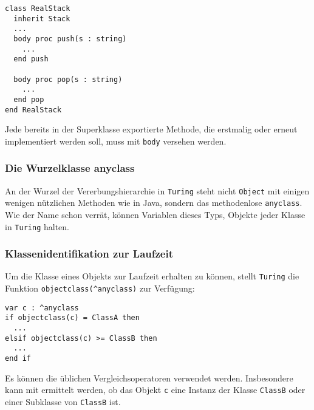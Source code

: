 \lstset{label=LIS:stack:real}
\begin{table}[h!]
\begin{lstlisting}
class RealStack
  inherit Stack
  ... 
  body proc push(s : string) 
    ...
  end push
  
  body proc pop(s : string)
    ...
  end pop
end RealStack
\end{lstlisting}
\end{table}
Jede bereits in der Superklasse exportierte Methode, die erstmalig oder erneut implementiert werden soll, muss mit \lstinline{body} versehen werden. 

\subsubsection{Die Wurzelklasse anyclass}

An der Wurzel der Vererbungshierarchie in \texttt{Turing} steht nicht \texttt{Object} mit einigen wenigen n\"utzlichen Methoden wie in Java, sondern das methodenlose \lstinline{anyclass}. Wie der Name schon verr\"at, k\"onnen Variablen dieses Typs, Objekte jeder Klasse in \texttt{Turing} halten.

\subsubsection{Klassenidentifikation zur Laufzeit}

Um die Klasse eines Objekts zur Laufzeit erhalten zu k\"onnen, stellt \texttt{Turing} die Funktion \lstinline{objectclass(^anyclass)} zur Verf\"ugung:

\lstset{label=LIS:stack:objectclass}
\begin{table}[h!]
\begin{lstlisting}
var c : ^anyclass
if objectclass(c) = ClassA then
  ...
elsif objectclass(c) >= ClassB then
  ...
end if 
\end{lstlisting}
\end{table}

Es k\"onnen die \"ublichen Vergleichsoperatoren verwendet werden. Insbesondere kann mit ermittelt werden, ob das Objekt \lstinline{c} eine Instanz der Klasse \lstinline{ClassB} oder einer Subklasse von \lstinline{ClassB} ist.

